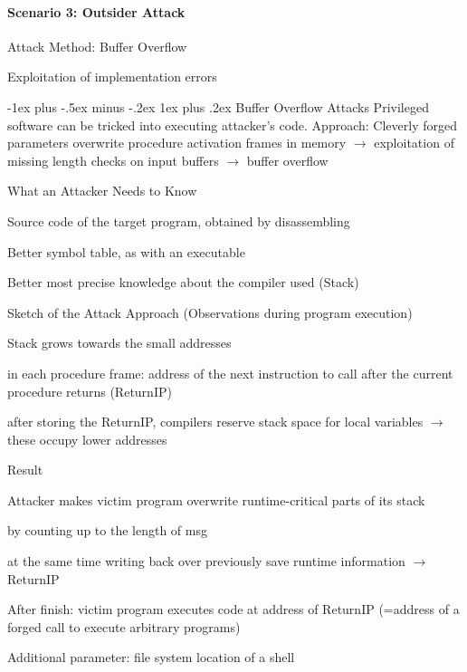 \documentclass[a4paper]{article}
\makeatletter
\renewcommand{\subsubsection}{\@startsection{subsubsection}{3}{0mm}%
                {-1ex plus -.5ex minus -.2ex}%
                {1ex plus .2ex}%
                {\normalfont\small\bfseries}}
\makeatother
\begin{document}
\begin{multicols}{3}
    \paragraph{Scenario 3: Outsider Attack}
    \begin{itemize*}
        \item Attack Method: Buffer Overflow
        \item Exploitation of implementation errors
    \end{itemize*}

    \subsubsection{Buffer Overflow Attacks}
    Privileged software can be tricked into executing attacker’s code.
    Approach: Cleverly forged parameters overwrite procedure activation frames in memory $\rightarrow$ exploitation of missing length checks on input buffers $\rightarrow$ buffer overflow

    What an Attacker Needs to Know
    \begin{itemize*}
        \item Source code of the target program, obtained by disassembling
        \item Better symbol table, as with an executable
        \item Better most precise knowledge about the compiler used (Stack)
    \end{itemize*}
    Sketch of the Attack Approach (Observations during program execution)
    \begin{itemize*}
        \item Stack grows towards the small addresses
        \item in each procedure frame: address of the next instruction to call after the current procedure returns (ReturnIP)
        \item after storing the ReturnIP, compilers reserve stack space for local variables $\rightarrow$ these occupy lower addresses
    \end{itemize*}
    Result
    \begin{itemize*}
        \item Attacker makes victim program overwrite runtime-critical parts of its stack
        \begin{itemize*}
            \item by counting up to the length of msg
            \item at the same time writing back over previously save runtime information $\rightarrow$ ReturnIP
        \end{itemize*}
        \item After finish: victim program executes code at address of ReturnIP (=address of a forged call to execute arbitrary programs)
        \item Additional parameter: file system location of a shell
    \end{itemize*}


\end{multicols}
\end{document}
